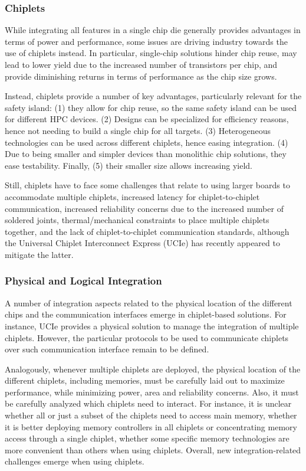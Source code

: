 {\color{black}
\subsubsection{Chiplets}
While integrating all features in a single chip die generally provides advantages in terms of power and performance, some issues are driving industry towards the use of chiplets instead. In particular, single-chip solutions hinder chip reuse, may lead to lower yield due to the increased number of transistors per chip, and provide diminishing returns in terms of performance as the chip size grows. 

Instead, chiplets provide a number of key advantages, particularly relevant for the safety island: (1) they allow for chip reuse, so the same safety island can be used for different HPC devices. (2) Designs can be specialized for efficiency reasons, hence not needing to build a single chip for all targets. (3) Heterogeneous technologies can be used across different chiplets, hence easing integration. (4) Due to being smaller and simpler devices than monolithic chip solutions, they ease testability. Finally, (5) their smaller size allows increasing yield.

Still, chiplets have to face some challenges that relate to using larger boards to accommodate multiple chiplets, increased latency for chiplet-to-chiplet communication, increased reliability concerns due to the increased number of soldered joints, thermal/mechanical constraints to place multiple chiplets together, and the lack of chiplet-to-chiplet communication standards, although the Universal Chiplet Interconnect Express (UCIe) has recently appeared to mitigate the latter.

\subsubsection{Physical and Logical Integration}
A number of integration aspects related to the physical location of the different chips and the communication interfaces emerge in chiplet-based solutions. For instance, UCIe provides a physical solution to manage the integration of multiple chiplets. However, the particular protocols to be used to communicate chiplets over such communication interface remain to be defined. 

Analogously, whenever multiple chiplets are deployed, the physical location of the different chiplets, including memories, must be carefully laid out to maximize performance, while minimizing power, area and reliability concerns. Also, it must be carefully analyzed which chiplets need to interact. For instance, it is unclear whether all or just a subset of the chiplets need to access main memory, whether it is better deploying memory controllers in all chiplets or concentrating memory access through a single chiplet, whether some specific memory technologies are more convenient than others when using chiplets. Overall, new integration-related challenges emerge when using chiplets. 

}
